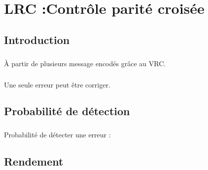 
\chapter{LRC :Contrôle parité croisée}

    \section{Introduction}

        \paragraph{}
À partir de plusieurs message encodés grâce au VRC.
        \paragraph{}
Une seule erreur peut être corriger.


    \section{Probabilité de détection}

        \paragraph{}
Probabilité de détecter une erreur :


    \section{Rendement}

        \paragraph{}
